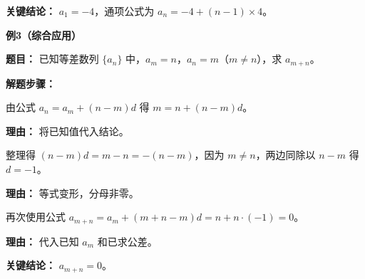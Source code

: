 \begin{examplebox}
	\textbf{\textcolor{CExample}{关键结论：}}
	\textbf{\(a_1 = -4\)}，通项公式为 \(a_n = -4 + (n-1)\times 4\)。

	\medskip
	\textbf{\textcolor{CExample}{例3（综合应用）}}

	\textbf{\textcolor{CExample}{题目：}}
	已知等差数列 \(\{a_n\}\) 中，\(a_m = n\)，\(a_n = m\)（\(m\neq n\)），求 \(a_{m+n}\)。

	\textbf{\textcolor{CExample}{解题步骤：}}
	\begin{description}[style=nextline, leftmargin=2.8em, labelsep=0.5em, itemsep=0.45em]
		\item[\textbf{第一步（列出关系）：}] 由公式 \(a_n = a_m + (n-m)d\) 得 \(m = n + (n-m)d\)。
		      \par\textbf{理由：} 将已知值代入结论。
		\item[\textbf{第二步（化简求解）：}] 整理得 \((n-m)d = m - n = -(n-m)\)，因为 \(m\neq n\)，两边同除以 \(n-m\) 得 \(d = -1\)。
		      \par\textbf{理由：} 等式变形，分母非零。
		\item[\textbf{第三步（计算目标）：}] 再次使用公式 \(a_{m+n} = a_m + (m+n - m)d = n + n\cdot(-1) = 0\)。
		      \par\textbf{理由：} 代入已知 \(a_m\) 和已求公差。
	\end{description}

	\textbf{\textcolor{CExample}{关键结论：}}
	\textbf{\(a_{m+n} = 0\)}。
\end{examplebox}